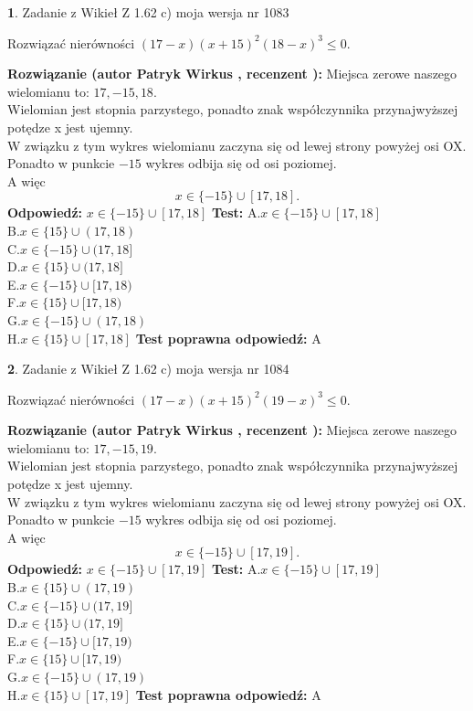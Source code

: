 \documentclass[12pt, a4paper]{article}
\theoremstyle{definition} %
\newtheorem{zad}{}
\newcommand{\zadStart}[1]{\begin{zad}#1\newline}
\newcommand{\zadStop}{\end{zad}}
\newcommand{\rozwStart}[2]{\noindent \textbf{Rozwiązanie (autor #1 , recenzent #2): }\newline}
\newcommand{\rozwStop}{\newline}
\newcommand{\odpStart}{\noindent \textbf{Odpowiedź:}\newline}
\newcommand{\odpStop}{\newline}
\newcommand{\testStart}{\noindent \textbf{Test:}\newline}
\newcommand{\testStop}{\newline}
\newcommand{\kluczStart}{\noindent \textbf{Test poprawna odpowiedź:}\newline}
\newcommand{\kluczStop}{\newline}
\begin{document}
\zadStart{Zadanie z Wikieł Z 1.62 c) moja wersja nr 1083}

Rozwiązać nierówności $(17-x)(x+15)^{2}(18-x)^{3}\le0$.
\zadStop
\rozwStart{Patryk Wirkus}{}
Miejsca zerowe naszego wielomianu to: $17, -15, 18$.\\
Wielomian jest stopnia parzystego, ponadto znak współczynnika przy\linebreak najwyższej potędze x jest ujemny.\\ W związku z tym wykres wielomianu zaczyna się od lewej strony powyżej osi OX.\\
Ponadto w punkcie $-15$ wykres odbija się od osi poziomej.\\
A więc $$x \in \{-15\} \cup [17,18].$$
\rozwStop
\odpStart
$x \in \{-15\} \cup [17,18]$
\odpStop
\testStart
A.$x \in \{-15\} \cup [17,18]$\\
B.$x \in \{15\} \cup (17,18)$\\
C.$x \in \{-15\} \cup (17,18]$\\
D.$x \in \{15\} \cup (17,18]$\\
E.$x \in \{-15\} \cup [17,18)$\\
F.$x \in \{15\} \cup [17,18)$\\
G.$x \in \{-15\} \cup (17,18)$\\
H.$x \in \{15\} \cup [17,18]$
\testStop
\kluczStart
A
\kluczStop



\zadStart{Zadanie z Wikieł Z 1.62 c) moja wersja nr 1084}

Rozwiązać nierówności $(17-x)(x+15)^{2}(19-x)^{3}\le0$.
\zadStop
\rozwStart{Patryk Wirkus}{}
Miejsca zerowe naszego wielomianu to: $17, -15, 19$.\\
Wielomian jest stopnia parzystego, ponadto znak współczynnika przy\linebreak najwyższej potędze x jest ujemny.\\ W związku z tym wykres wielomianu zaczyna się od lewej strony powyżej osi OX.\\
Ponadto w punkcie $-15$ wykres odbija się od osi poziomej.\\
A więc $$x \in \{-15\} \cup [17,19].$$
\rozwStop
\odpStart
$x \in \{-15\} \cup [17,19]$
\odpStop
\testStart
A.$x \in \{-15\} \cup [17,19]$\\
B.$x \in \{15\} \cup (17,19)$\\
C.$x \in \{-15\} \cup (17,19]$\\
D.$x \in \{15\} \cup (17,19]$\\
E.$x \in \{-15\} \cup [17,19)$\\
F.$x \in \{15\} \cup [17,19)$\\
G.$x \in \{-15\} \cup (17,19)$\\
H.$x \in \{15\} \cup [17,19]$
\testStop
\kluczStart
A
\kluczStop
\end{document}

